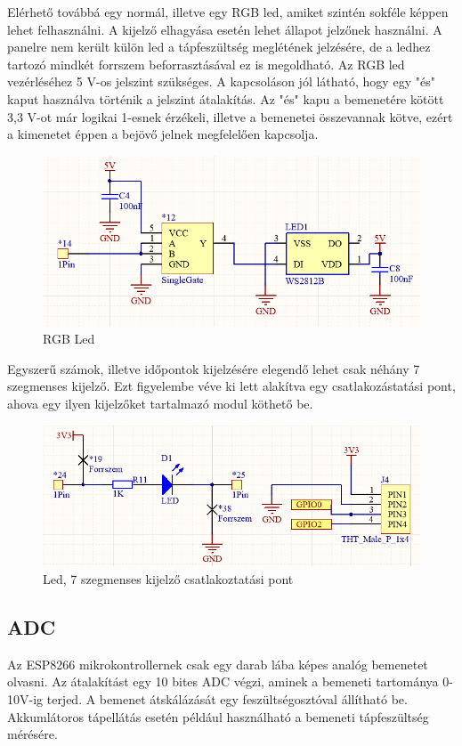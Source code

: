Elérhető továbbá egy normál, illetve egy RGB led, amiket szintén sokféle képpen lehet felhasználni. A kijelző elhagyása esetén lehet állapot jelzőnek használni. A panelre nem került külön led a tápfeszültség meglétének jelzésére, de a ledhez tartozó mindkét forrszem beforrasztásával ez is megoldható. Az RGB led vezérléséhez 5 V-os jelszint szükséges. A kapcsoláson jól látható, hogy egy "és" kaput használva történik a jelszint átalakítás. Az "és" kapu a bemenetére kötött 3,3 V-ot már logikai 1-esnek érzékeli, illetve a bemenetei összevannak kötve, ezért a kimenetet éppen a bejövő jelnek megfelelően kapcsolja.
\begin{figure}[!ht]
    \centering
    \includegraphics[width=150mm, keepaspectratio]{figures/rgb_led.png}
    \caption{RGB Led}
    \label{fig:TeXstudio}
\end{figure}
Egyszerű számok, illetve időpontok kijelzésére elegendő lehet csak néhány 7 szegmenses kijelző. Ezt figyelembe véve ki lett alakítva egy csatlakozástatási pont, ahova egy ilyen kijelzőket tartalmazó modul köthető be.
\begin{figure}[!ht]
    \centering
    \includegraphics[width=150mm, keepaspectratio]{figures/led_connector.png}
    \caption{Led, 7 szegmenses kijelző csatlakoztatási pont}
    \label{fig:TeXstudio}
\end{figure}



\subsection{ADC}
Az ESP8266 mikrokontrollernek csak egy darab lába képes analóg bemenetet olvasni. Az átalakítást egy 10 bites ADC végzi, aminek a bemeneti tartománya 0-10V-ig terjed. A bemenet átskálázását egy feszültségosztóval állítható be. Akkumlátoros tápellátás esetén például használható a bemeneti tápfeszültség mérésére.

